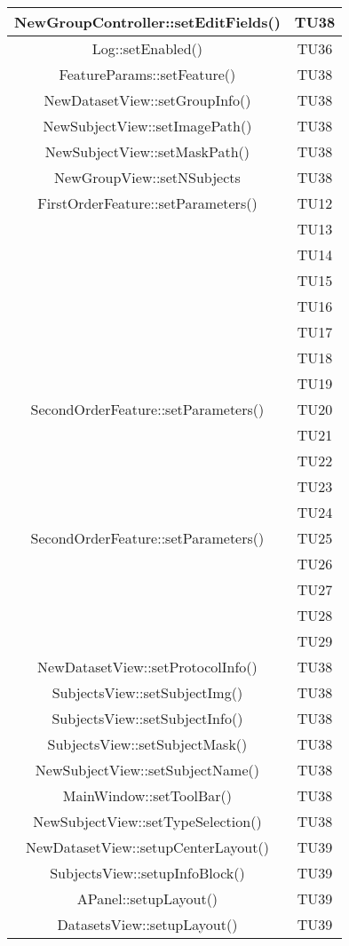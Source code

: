 \begin{center}
\begin{longtable}{|c|c|}
\hline 
NewGroupController::setEditFields() & TU38 \\
\hline 
Log::setEnabled() & TU36 \\
\hline 
FeatureParams::setFeature() & TU38 \\
\hline 
NewDatasetView::setGroupInfo() & TU38 \\
\hline 
NewSubjectView::setImagePath() & TU38 \\
\hline 
NewSubjectView::setMaskPath() & TU38 \\
\hline 
NewGroupView::setNSubjects & TU38 \\
\hline 
FirstOrderFeature::setParameters() & TU12 \\
 & TU13 \\
 & TU14 \\
 & TU15 \\
 & TU16 \\
 & TU17 \\
 & TU18 \\
 & TU19 \\
\hline 
SecondOrderFeature::setParameters()  & TU20 \\
 & TU21 \\
 & TU22 \\
 & TU23 \\
 & TU24 \\
\hline 
SecondOrderFeature::setParameters() & TU25 \\
 & TU26 \\
 & TU27 \\
 & TU28 \\
 & TU29 \\
\hline 
NewDatasetView::setProtocolInfo() & TU38 \\
\hline 
SubjectsView::setSubjectImg() & TU38 \\
\hline 
SubjectsView::setSubjectInfo() & TU38 \\
\hline 
SubjectsView::setSubjectMask() & TU38 \\
\hline 
NewSubjectView::setSubjectName() & TU38 \\
\hline 
MainWindow::setToolBar() & TU38 \\
\hline 
NewSubjectView::setTypeSelection() & TU38 \\
\hline 
NewDatasetView::setupCenterLayout() & TU39 \\
\hline 
SubjectsView::setupInfoBlock() & TU39 \\
\hline 
APanel::setupLayout() & TU39 \\
\hline 
DatasetsView::setupLayout() & TU39 \\

\end{longtable}
\end{center}
